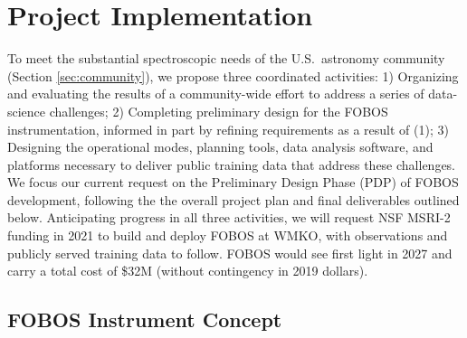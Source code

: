 \documentclass[oneside,11pt]{amsart}
\newcommand{\comment}[2][todo]{{\color{#1}[[{\bf #2}]]}}
\begin{document}
\section{Project Implementation}
\label{sec:project}

To meet the substantial spectroscopic needs of the U.S.\ astronomy
community (Section \ref{sec:community}), we propose three coordinated
activities: 1) Organizing and evaluating the results of a community-wide
effort to address a series of data-science challenges; 2) Completing
preliminary design for the FOBOS instrumentation, informed in part by
refining requirements as a result of (1); 3) Designing the operational
modes, planning tools, data analysis software, and platforms necessary
to deliver public training data that address these challenges.  We focus
our current request on the Preliminary Design Phase (PDP) of FOBOS
development, following the the overall project plan and final
deliverables outlined below.  Anticipating progress in all three
activities, we will request NSF MSRI-2 funding in 2021 to build and
deploy FOBOS at WMKO, with observations and publicly served training
data to follow.  FOBOS would see first light in 2027 and carry a total
cost of \$32M (without contingency in 2019 dollars).

\subsection{FOBOS Instrument Concept}
\label{sec:concept}

\end{document}
